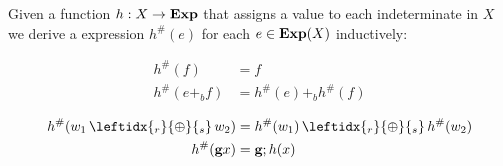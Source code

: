 \documentclass[a4paper,UKenglish,cleveref, autoref, thm-restate]{lipics-v2021}
\newcommand{\Exp}{\textbf{\upshape{Exp}}}
\newcommand{\WC}[2]{\,\leftidx{_{#1}}{{\oplus}}{_{#2}}\,}
\newcommand{\wgkat}{\textsf{\upshape{wGKAT}}\xspace}
\theoremstyle{plain}\newtheoremrep{thm}{Theorem}[section]
\begin{document}
	\begin{defn}
		Given a function $h: X \to \Exp$ that assigns a value to each indeterminate in $X$ we derive a \wgkat expression $h^{\#}(e)$ for each $e \in \Exp(X)$ inductively:
		
		\begin{minipage}[t]{.45\textwidth}
			\begin{align}
				h^{\#}(f) &= f \label{HSharpDef1}\\
				h^{\#}(e+_b f) &= h^{\#}(e) +_b h^{\#}(f)\label{HSharpDefGuarded}
			\end{align}
		\end{minipage}
		\begin{minipage}[t]{.5\textwidth}
			\begin{align}
				h^{\#}(w_1 \WC{r}{s} w_2) &= h^{\#}(w_1) \WC{r}{s} h^{\#}(w_2)\label{HSharpDef2}\\
				h^{\#}(\textbf{g}x) &= \textbf{g};h(x)\label{HSharpDef3}
			\end{align}\label{HSharpDef}\vspace{-.5cm}
		\end{minipage}
	\end{defn}
	
\end{document}
